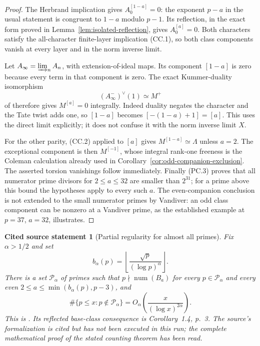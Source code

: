 \documentclass[11pt,a4paper]{article}
\newtheorem{sourcefact}[theorem]{Cited source statement}
\theoremstyle{definition}
\begin{document}
\begin{proof}
The Herbrand implication gives $A_0^{[1-a]}=0$:
the exponent $p-a$ in the usual statement is congruent to
$1-a$ modulo $p-1$. Its reflection, in the exact form proved
in Lemma~\ref{lem:isolated-reflection}, gives $A_0^{[a]}=0$.
Both characters satisfy the all-character finite-layer implication
(CC.1), so both class components vanish at every layer and in
the norm inverse limit.

Let $A_\infty=\varinjlim_n A_n$, with extension-of-ideal maps.
Its component $[1-a]$ is zero because every term in that
component is zero. The exact Kummer-duality isomorphism
\[
                    (A_\infty^-)^\vee(1)\simeq M^+
\]
of \cite[Proposition~3.4.7 and its proof, p.~92]{SharifiIwasawaFull2026}
therefore gives $M^{[a]}=0$ integrally. Indeed duality negates
the character and the Tate twist adds one, so $[1-a]$ becomes
$[-(1-a)+1]=[a]$. This uses the direct limit explicitly;
it does not confuse it with the norm inverse limit $X$.

For the other parity, (CC.2) applied to $[a]$ gives
$M^{[1-a]}\simeq\Lambda$ unless $a=2$. The exceptional
component is then $M^{[-1]}$, whose integral rank-one
freeness is the Coleman calculation already used in
Corollary~\ref{cor:odd-companion-exclusion}.
The asserted torsion vanishings follow immediately.
Finally (PC.3) proves that all numerator prime divisors for
$2\leq a\leq32$ are smaller than $2^{31}$; for a prime above
this bound the hypotheses apply to every such $a$.
The even-companion conclusion is not extended to the small
numerator primes by Vandiver: an odd class component can be
nonzero at a Vandiver prime, as the established example at
$p=37$, $a=32$, illustrates.
\end{proof}

\begin{sourcefact}[Partial regularity for almost all primes]
\label{source:partial-regularity}
Fix $\alpha>1/2$ and set
\[
                  b_\alpha(p)=
                  \left\lfloor\frac{\sqrt p}{(\log p)^\alpha}\right\rfloor.
\]
There is a set $\mathcal P_\alpha$ of primes such that
$p\nmid\operatorname{num}(B_a)$ for every $p\in\mathcal P_\alpha$
and every even $2\leq a\leq\min(b_\alpha(p),p-3)$, and
\[
 \#\{p\leq x:p\notin\mathcal P_\alpha\}
          =O_\alpha\!\left(\frac{x}{(\log x)^{2\alpha}}\right).
 \tag{BC.2}
\]
This is \cite[Theorem~1.1, p.~2; full proof in \S3,
pp.~9--10, using \S2, pp.~6--8]{ChenEtAl2026}.
Its reflected base-class consequence is Corollary~1.4, p.~3.
The source's formalization is cited but has not been executed
in this run; the complete mathematical proof of the stated
counting theorem has been read.
\end{sourcefact}
\end{document}
